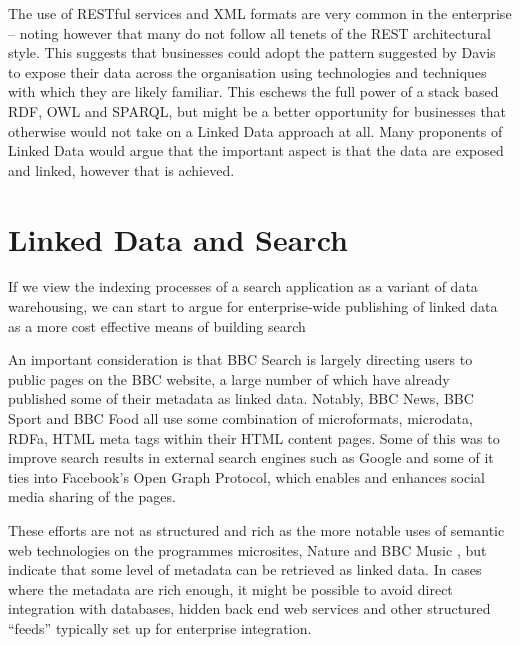 The use of RESTful services and XML formats are very common in
the enterprise -- noting however that many do not follow all tenets
of the REST architectural style. This suggests that businesses
could adopt the pattern suggested by Davis to expose their
data across the organisation using technologies and techniques
with which they are likely familiar. This eschews the full power
of a stack based RDF, OWL and SPARQL, but might be a better
opportunity for businesses that otherwise would not take on a
Linked Data approach at all.  Many proponents of Linked Data would
argue that the important aspect is that the data are exposed and
linked, however that is achieved.

\section{Linked Data and Search}

If we view the indexing processes
of a search application as a variant of data warehousing,
we can start to argue for enterprise-wide publishing of
linked data as a more cost effective means of building search

An important consideration is that BBC Search is largely directing
users to public pages on the BBC website, a large number of which have
already published some of their metadata as linked data. Notably, BBC News,
BBC Sport and BBC Food all use some combination
of microformats, microdata, RDFa, HTML meta tags within their HTML content
pages. Some of this was to improve search results in external search engines
such as Google and some of it ties into Facebook's Open Graph Protocol, which
enables and enhances social media sharing of the pages.

These efforts are not as structured and rich as the more notable uses
of semantic web technologies on the programmes microsites, Nature and BBC
Music \cite{raimond2010use}, but indicate that some level of metadata
can be retrieved
as linked data. In cases where the metadata are rich enough, it might be
possible to avoid direct integration with databases, hidden back end
web services and other structured ``feeds'' typically set up for enterprise
integration.

